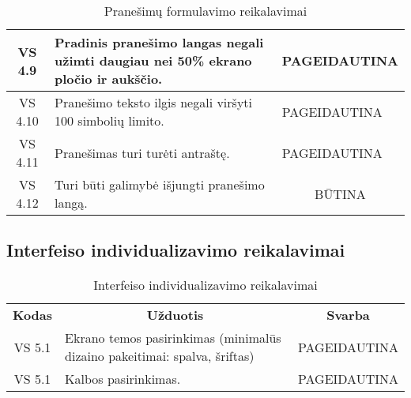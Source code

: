 \documentclass{VUMIFPSkursinis}
\begin{document}
\begin{center}
\begin{table}[H]
\begin{tabular}{|p{2cm}|p{11cm}|p{2cm}|}
	\hline
		\multicolumn{1}{|c|}{VS 4.9}&
		\multicolumn{1}{|p{12,5cm}|}{Pradinis pranešimo langas negali užimti daugiau nei 50\% ekrano pločio ir aukščio.}& 
		\multicolumn{1}{|p{1.5cm}|}{PAGEIDAUTINA}\\
	\hline
		\multicolumn{1}{|c|}{VS 4.10}&
		\multicolumn{1}{|p{12,5cm}|}{Pranešimo teksto ilgis negali viršyti 100 simbolių limito.}& 
		\multicolumn{1}{|p{1.5cm}|}{PAGEIDAUTINA}\\
	\hline
		\multicolumn{1}{|c|}{VS 4.11}&
		\multicolumn{1}{|p{12,5cm}|}{Pranešimas turi turėti antraštę.}& 
		\multicolumn{1}{|p{1.5cm}|}{PAGEIDAUTINA}\\
	\hline
		\multicolumn{1}{|c|}{VS 4.12}&
		\multicolumn{1}{|p{12,5cm}|}{Turi būti galimybė išjungti pranešimo langą.}& 
		\multicolumn{1}{|c|}{BŪTINA}\\
	\hline	 	
	
	\end{tabular}
	\caption{Pranešimų formulavimo reikalavimai}
	\label{table:5}
	\end{table}

\end{center}

\pagebreak

\subsection{Interfeiso individualizavimo reikalavimai}

\begin{center}
	\begin{table}[H]
	\begin{tabular}{|p{2cm}|p{13cm}|p{2cm}|}
	\hline
	    \rowcolor{lightgray}
	    \multicolumn{3}{|c|}{Interfeiso individualizavimo reikalavimai}\\
	\hline
		\multicolumn{1}{|c|}{ {\bfseries Kodas}}&
		\multicolumn{1}{|c|}{ {\bfseries Užduotis}}&
		\multicolumn{1}{|c|}{{\bfseries Svarba}}\\		
	\hline
		\multicolumn{1}{|c|}{VS 5.1}&
		\multicolumn{1}{|p{12,9cm}|}{Ekrano temos pasirinkimas (minimalūs dizaino pakeitimai: spalva, šriftas)}& 
		\multicolumn{1}{|p{1.5cm}|}{PAGEIDAUTINA}\\
	\hline
		\multicolumn{1}{|c|}{VS 5.1}&
		\multicolumn{1}{|p{12,9cm}|}{Kalbos pasirinkimas.}& 
		\multicolumn{1}{|p{1.5cm}|}{PAGEIDAUTINA}\\
	\hline
	
	\end{tabular}
	\caption{Interfeiso individualizavimo reikalavimai}
	\label{table:6}	
	\end{table}
\end{center}
\end{document}
